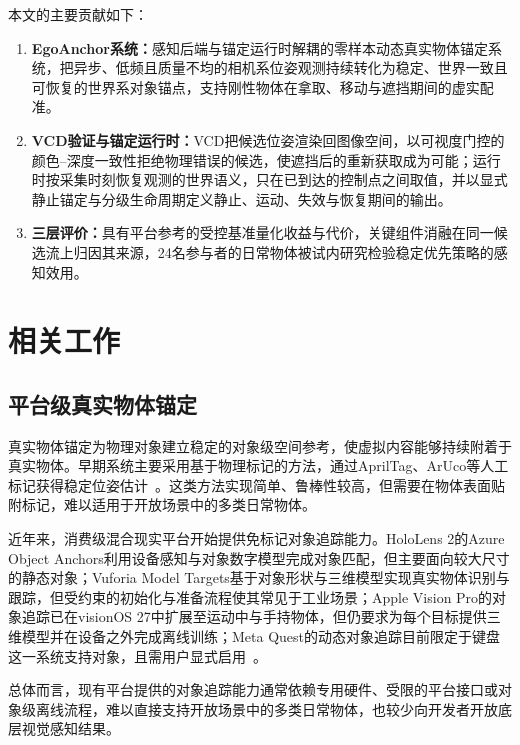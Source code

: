\documentclass[review]{vgtc}
\begin{document}
本文的主要贡献如下：

\begin{enumerate}
  \item \textbf{EgoAnchor系统：}感知后端与锚定运行时解耦的零样本动态真实物体锚定系统，把异步、低频且质量不均的相机系位姿观测持续转化为稳定、世界一致且可恢复的世界系对象锚点，支持刚性物体在拿取、移动与遮挡期间的虚实配准。

  \item \textbf{VCD验证与锚定运行时：}VCD把候选位姿渲染回图像空间，以可视度门控的颜色--深度一致性拒绝物理错误的候选，使遮挡后的重新获取成为可能；运行时按采集时刻恢复观测的世界语义，只在已到达的控制点之间取值，并以显式静止锚定与分级生命周期定义静止、运动、失效与恢复期间的输出。

  \item \textbf{三层评价：}具有平台参考的受控基准量化收益与代价，关键组件消融在同一候选流上归因其来源，24名参与者的日常物体被试内研究检验稳定优先策略的感知效用。
\end{enumerate}

\section{相关工作}\label{sec:related-work}

\subsection{平台级真实物体锚定}

真实物体锚定为物理对象建立稳定的对象级空间参考，使虚拟内容能够持续附着于真实物体。早期系统主要采用基于物理标记的方法，通过AprilTag、ArUco等人工标记获得稳定位姿估计~\cite{kato1999artoolkit,olson2011apriltag,garridojurado2014aruco}。这类方法实现简单、鲁棒性较高，但需要在物体表面贴附标记，难以适用于开放场景中的多类日常物体。

近年来，消费级混合现实平台开始提供免标记对象追踪能力。HoloLens 2的Azure Object Anchors利用设备感知与对象数字模型完成对象匹配，但主要面向较大尺寸的静态对象；Vuforia Model Targets基于对象形状与三维模型实现真实物体识别与跟踪，但受约束的初始化与准备流程使其常见于工业场景；Apple Vision Pro的对象追踪已在visionOS 27中扩展至运动中与手持物体，但仍要求为每个目标提供三维模型并在设备之外完成离线训练；Meta Quest的动态对象追踪目前限定于键盘这一系统支持对象，且需用户显式启用~\cite{appleObjectAnchor,appleObjectTracking2026,azureObjectAnchors,vuforiaModelTargets,metaDynamicObjectTracker}。

总体而言，现有平台提供的对象追踪能力通常依赖专用硬件、受限的平台接口或对象级离线流程，难以直接支持开放场景中的多类日常物体，也较少向开发者开放底层视觉感知结果。
\end{document}
